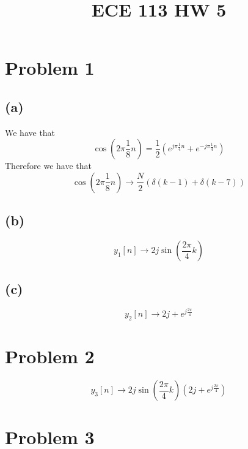 
\title{ECE 113 HW 5}

\maketitle
\section*{Problem 1}
\subsection*{(a)}
We have that
$$\cos(2\pi\frac{1}{8}n)=\frac{1}{2}\left(e^{j\pi\frac{1}{4}n}+e^{-j\pi\frac{1}{4}n}\right)$$
Therefore we have that
$$\cos(2\pi\frac{1}{8}n)\to\boxed{\frac{N}{2}\left(\delta(k-1)+\delta(k-7)\right)}$$
\subsection*{(b)}
$$y_1[n]\to\boxed{2j\sin(\frac{2\pi}{4}k)}$$
\subsection*{(c)}
$$y_2[n]\to\boxed{2j+e^{j\frac{2\pi}{4}}}$$
\section*{Problem 2}
$$y_3[n]\to\boxed{2j\sin(\frac{2\pi}{4}k)\left(2j+e^{j\frac{2\pi}{4}}\right)}$$
\section*{Problem 3}
